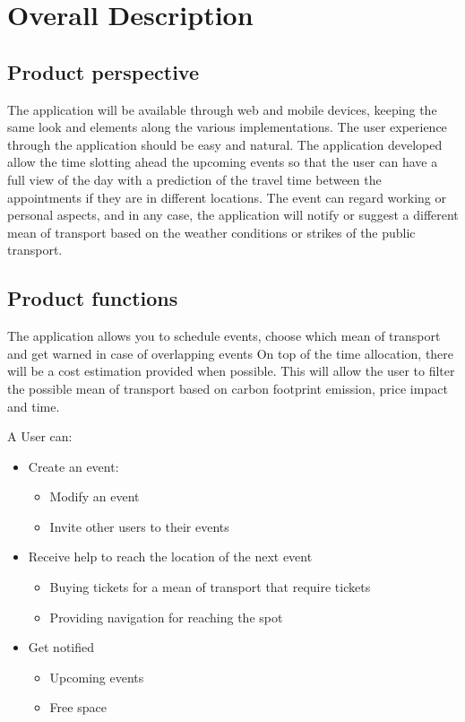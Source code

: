 \chapter{Overall Description}
\label{cha:desc}

\section{Product perspective}
\label{sec:productperspective}
The application will be available through web and mobile devices, keeping the same look and elements along the various implementations.
The user experience through the application should be easy and natural.
The application developed allow the time slotting ahead the upcoming events so that the user can have a full view of the day with a prediction of the travel time between the appointments if they are in different locations.
The event can regard working or personal aspects, and in any case, the application will notify or suggest a different mean of transport based on the weather conditions or strikes of the public transport.

\section{Product functions}
\label{sec:productfunctions}
The application allows you to schedule events, choose which mean of transport and get warned in case of overlapping events
On top of the time allocation, there will be a cost estimation provided when possible. 
This will allow the user to filter the possible mean of transport based on carbon footprint emission, price impact and time.

A User can:
\begin{itemize}
\item Create an event:
\begin{itemize}
\item Modify an event
\item Invite other users to their events
\end{itemize}
\item Receive help to reach the location of the next event
\begin{itemize}
\item Buying tickets for a mean of transport that require tickets
\item Providing navigation for reaching the spot 
\end{itemize}
\end{itemize}
\begin{itemize}
\item Get notified
\begin{itemize}
\item Upcoming events
\item Free space
\end{itemize}
\end{itemize}


